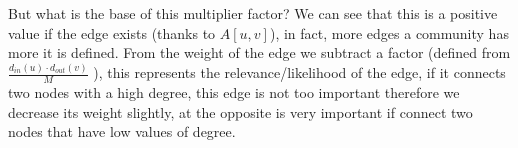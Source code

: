 But what is the base of this multiplier factor? We can see that this is a positive value if the edge exists (thanks to $\displaystyle A \left[ u,v \right]$), in fact, more edges a community has more it is defined. From the weight of the edge we subtract a factor (defined from $\displaystyle \frac{ d_{in}\left(u\right) \cdot d_{out}\left(v\right) }{M}$ ), this represents the relevance/likelihood of the edge, if it connects two nodes with a high degree, this edge is not too important therefore we decrease its weight slightly, at the opposite is very important if connect two nodes that have low values of degree.
%
%
%
%
%
%
%
